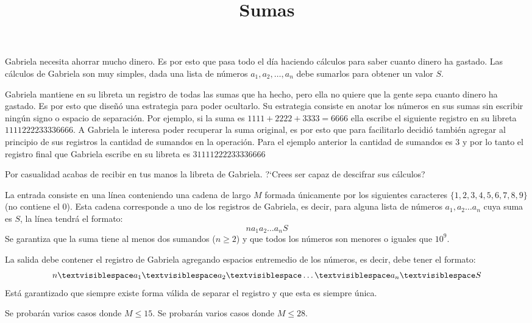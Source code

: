 \documentclass{oci}
\title{Sumas}
\begin{document}
\begin{problemDescription}
Gabriela necesita ahorrar mucho dinero.
Es por esto que pasa todo el día haciendo cálculos para saber cuanto dinero
ha gastado.
Las cálculos de Gabriela son muy simples, dada una lista de números $a_1, a_2,
\dots, a_n$ debe sumarlos para obtener un valor $S$.

Gabriela mantiene en su libreta un registro de todas las sumas que ha hecho,
pero ella no quiere que la gente sepa cuanto dinero ha gastado.
Es por esto que diseñó una estrategia para poder ocultarlo.
Su estrategia consiste en anotar los números en sus sumas sin escribir
ningún signo o espacio de separación.
Por ejemplo, si la suma es $1111+2222+3333=6666$ ella escribe el siguiente
registro en su libreta $1111222233336666$.
A Gabriela le interesa poder recuperar la suma original, es por esto que
para facilitarlo decidió también agregar al principio de sus registros la
cantidad de sumandos en la operación.
Para el ejemplo anterior la cantidad de sumandos es $3$ y por lo tanto el
registro final que Gabriela escribe en su libreta es $31111222233336666$

Por casualidad acabas de recibir en tus manos la libreta de Gabriela.
?`Crees ser capaz de descifrar sus cálculos?
\end{problemDescription}

\begin{inputDescription}
La entrada consiste en una línea conteniendo una cadena de largo $M$ formada
únicamente por los siguientes caracteres $\{1,2,3,4,5,6,7,8,9\}$ (no contiene el
$0$).
Esta cadena corresponde a uno de los registros de Gabriela, es decir, para
alguna lista de números $a_1,a_2\dots a_n$ cuya suma es $S$, la línea tendrá el
formato:
$$n a_1 a_2 \dots a_nS$$
Se garantiza que la suma tiene al menos dos sumandos ($n\geq 2$) y que todos los
números son menores o iguales que $10^9$.
\end{inputDescription}

\begin{outputDescription}
La salida debe contener el registro de Gabriela agregando espacios 
entremedio de los números, es decir, debe tener el formato:
$$n\textvisiblespace a_1\textvisiblespace a_2\textvisiblespace
\dots\textvisiblespace a_n\textvisiblespace S$$
Está garantizado que siempre existe forma válida de separar el registro y que
esta es siempre única.
\end{outputDescription}

\begin{scoreDescription}
   Se probarán varios casos donde $M\leq 15$.
   Se probarán varios casos donde $M\leq 28$.
\end{scoreDescription}

\begin{sampleDescription}
\end{sampleDescription}
\end{document}
